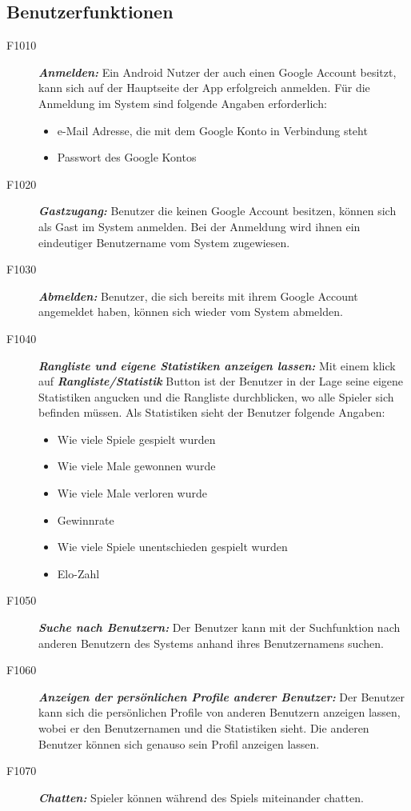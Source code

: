 \documentclass[parskip=full]{scrartcl}
\begin{document}
	\subsection{Benutzerfunktionen}
	\begin{description}
		\item[F1010] \textbf{\textit{Anmelden: }} Ein \gls{Android} Nutzer der auch einen Google Account besitzt, kann sich auf der Hauptseite der App erfolgreich anmelden. Für die Anmeldung im System sind folgende Angaben erforderlich:
		\begin{itemize}
			\item e-Mail Adresse, die mit dem Google Konto in Verbindung steht
			\item Passwort des Google Kontos
		\end{itemize}  
		\item[F1020] \textbf{\textit{Gastzugang: }} Benutzer die keinen Google Account besitzen, können sich als Gast im System anmelden. Bei der Anmeldung wird ihnen ein eindeutiger Benutzername vom System zugewiesen. 
		\item[F1030] \textbf{\textit{Abmelden: }} Benutzer, die sich bereits mit ihrem Google Account angemeldet haben, können sich wieder vom System abmelden.
		
		
		\item [F1040] \textbf{\textit{Rangliste und eigene Statistiken anzeigen lassen: }} Mit einem klick auf \textbf{\textit{Rangliste/Statistik }} Button ist der Benutzer in der Lage seine eigene Statistiken angucken und die Rangliste durchblicken, wo alle Spieler sich befinden müssen. Als Statistiken sieht der Benutzer folgende Angaben:
		
		\begin{itemize}
			\item Wie viele Spiele gespielt wurden
			\item Wie viele Male gewonnen wurde
			\item Wie viele Male verloren wurde
			\item Gewinnrate
			\item Wie viele Spiele unentschieden gespielt wurden
			\item Elo-Zahl
			
		\end{itemize}
		\item[F1050] \textbf{\textit{Suche nach Benutzern: }} Der Benutzer kann mit der Suchfunktion nach anderen Benutzern des Systems anhand ihres Benutzernamens suchen.
		
		\item[F1060]  \textbf{\textit{Anzeigen der persönlichen Profile anderer Benutzer: }}
		Der Benutzer kann sich die persönlichen Profile von anderen Benutzern anzeigen lassen, wobei er den Benutzernamen und die Statistiken sieht. Die anderen Benutzer können sich genauso sein Profil anzeigen lassen.
		\item[F1070] \textbf{\textit{Chatten: }} Spieler können während des Spiels miteinander chatten.	
		
	\end{description}
	
\end{document}
